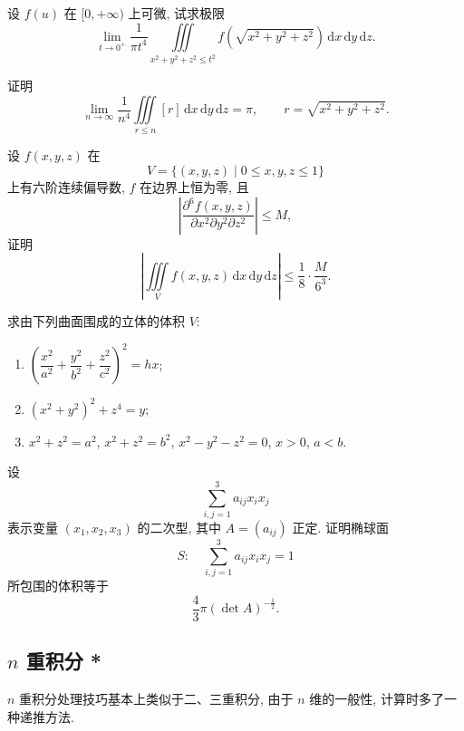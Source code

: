 \documentclass[../数学分析培优讲义.tex]{subfiles}
\begin{document}
\begin{example}
设 $f(u)$ 在 $\lbrack0,+\infty)$ 上可微, 试求极限
\[
    \lim\limits_{t\to0^+}\dfrac{1}{\pi t^4}
    \iiint\limits_{x^2+y^2+z^2\leq t^2}
    f\left(\sqrt{x^2+y^2+z^2}\right)\,\mathrm{d}x\,\mathrm{d}y\,\mathrm{d}z.
\]
\end{example}
\exampleblank

\begin{example}[\markstar]
证明
\[
    \lim\limits_{n\to\infty}\dfrac{1}{n^4}
    \iiint\limits_{r\leq n}[r]\,\mathrm{d}x\,\mathrm{d}y\,\mathrm{d}z=\pi,
    \qquad r=\sqrt{x^2+y^2+z^2}.
\]
\end{example}
\exampleblank

\begin{example}
设 $f(x,y,z)$ 在
\[
    V=\{(x,y,z)\mid0\leq x,y,z\leq1\}
\]
上有六阶连续偏导数, $f$ 在边界上恒为零, 且
\[
    \left|\dfrac{\partial^6f(x,y,z)}{\partial x^2\partial y^2\partial z^2}\right|\leq M,
\]
证明
\[
    \left|\iiint\limits_Vf(x,y,z)\,\mathrm{d}x\,\mathrm{d}y\,\mathrm{d}z\right|
    \leq\dfrac{1}{8}\cdot\dfrac{M}{6^3}.
\]
\end{example}
\exampleblank

\begin{example}
求由下列曲面围成的立体的体积 $V$:
\begin{enumerate}[label=(\arabic*)]
    \item $\left(\dfrac{x^2}{a^2}+\dfrac{y^2}{b^2}+\dfrac{z^2}{c^2}\right)^2=hx$;
    \item $(x^2+y^2)^2+z^4=y$;
    \item $x^2+z^2=a^2$, $x^2+z^2=b^2$, $x^2-y^2-z^2=0$, $x>0$, $a<b$.
\end{enumerate}
\end{example}
\exampleblank

\begin{example}[\markstar]
设
\[
    \sum\limits_{i,j=1}^3a_{ij}x_ix_j
\]
表示变量 $(x_1,x_2,x_3)$ 的二次型, 其中 $A=(a_{ij})$ 正定. 证明椭球面
\[
    S:\quad\sum\limits_{i,j=1}^3a_{ij}x_ix_j=1
\]
所包围的体积等于
\[
    \dfrac{4}{3}\pi(\det A)^{-\frac{1}{2}}.
\]
\end{example}
\exampleblank


\newpage

\subsection{\texorpdfstring{$n$}{n} 重积分 *}

$n$ 重积分处理技巧基本上类似于二、三重积分, 由于 $n$ 维的一般性, 计算时多了一种递推方法.
\end{document}
